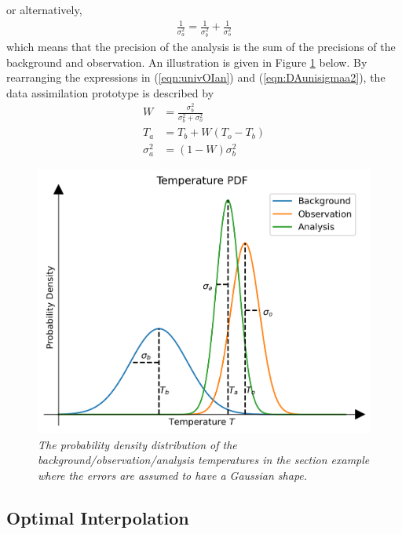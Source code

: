 or alternatively,
\begin{align}
\frac{1}{\sigma_a^2} = \frac{1}{\sigma_b^2} + \frac{1}{\sigma_o^2}
\end{align}
which means that the precision of the analysis is the sum of the precisions of
the background and observation. An illustration is given in Figure \ref{fig:DA1} below. By rearranging the expressions in (\ref{eqn:univOIan}) and (\ref{eqn:DAunisigmaa2}), the data assimilation prototype is described by
\begin{subequations}
\label{eqn:univOIschm}
\begin{align}
W &= \frac{\sigma_b^2}{\sigma_b^2 + \sigma_o^2}\\  
T_a &= T_b + W(T_o - T_b) \label{eqn:uniDAweight} \\
\sigma_a^2 &= (1 - W)\sigma_b^2
\end{align}    
\end{subequations}

\begin{figure}[ht!]
    \centering
    \includegraphics[scale=0.75]{graphics/DA1.png}
    \caption{\textit{The probability density distribution of the background/observation/analysis temperatures in the section example where the errors are assumed to have a Gaussian shape.}}
    \label{fig:DA1}
\end{figure}

\subsection{Optimal Interpolation}

